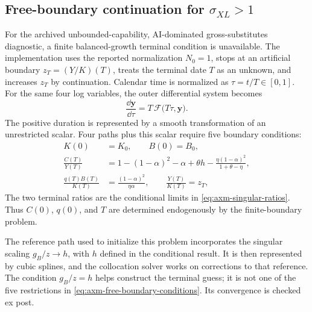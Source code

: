 \subsection{Free-boundary continuation for \texorpdfstring{\(\sigma_{XL}>1\)}{sigma XL > 1}}

For the archived unbounded-capability, AI-dominated gross-substitutes
diagnostic, a
finite balanced-growth terminal condition is unavailable. The implementation
uses the reported normalization \(N_0=1\), stops at an artificial boundary
\(z_T=(Y/K)(T)\), treats the terminal date \(T\) as an unknown, and increases
\(z_T\) by continuation. Calendar time is normalized as \(\tau=t/T\in[0,1]\).
For the same four log variables, the outer differential system becomes
\begin{equation}
 \frac{\dd\mathbf y}{\dd\tau}
 =T\,\mathcal F\bigl(T\tau,\mathbf y\bigr).
 \label{eq:axm-free-boundary-rhs}
\end{equation}
The positive duration is represented by a smooth transformation of an
unrestricted scalar. Four paths plus this scalar require five boundary
conditions:
\begin{equation}
 \begin{split}
 K(0)&=K_0,\qquad B(0)=B_0,\\
 \frac{C(T)}{Y(T)}
 &=1-(1-\alpha)^2-\alpha+\theta h
 -\frac{\eta(1-\alpha)^2}{1+\theta-\eta},\\
 \frac{q(T)B(T)}{K(T)}&=\frac{(1-\alpha)^2}{\eta\alpha},\qquad
 \frac{Y(T)}{K(T)}=z_T,
 \end{split}
 \label{eq:axm-free-boundary-conditions}
\end{equation}
The two terminal ratios are the conditional limits in
\eqref{eq:axm-singular-ratios}. Thus \(C(0)\), \(q(0)\), and \(T\) are
determined endogenously by the finite-boundary problem.

The reference path used to initialize this problem incorporates the singular
scaling \(g_B/z\to h\), with \(h\) defined in the conditional result. It is then
represented by cubic splines, and the collocation solver works on corrections to
that reference. The condition \(g_B/z=h\) helps construct the terminal guess; it
is not one of the five restrictions in
\eqref{eq:axm-free-boundary-conditions}. Its convergence is checked ex post.

